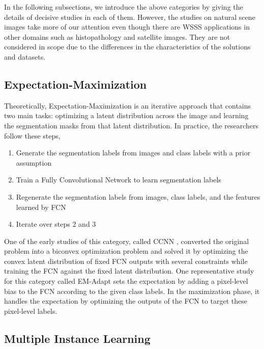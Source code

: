 \documentclass[sn-mathphys]{sn-jnl}
\theoremstyle{thmstyleone}
\theoremstyle{thmstyletwo}\newtheorem{example}{Example}\newtheorem{remark}{Remark}
\theoremstyle{thmstylethree}\newtheorem{definition}{Definition}
\begin{document}
In the following subsections, we introduce the above categories by giving the details of decisive studies in each of them. However, the studies on natural scene images take more of our attention even though there are WSSS applications \cite{DBLP:journals/corr/abs-1808-04277, 9009552, 8953780, DBLP:journals/corr/LinCDWQH17, DBLP:journals/corr/abs-1904-03983, robinson2019large, DBLP:journals/corr/abs-1806-03510, Wang2018WeaklySL} in other domains such as histopathology and satellite images. They are not considered in scope due to the differences in the characteristics of the solutions and datasets.

\subsection{Expectation-Maximization}
\label{expectation_maximization}

Theoretically, Expectation-Maximization is an iterative approach that contains two main tasks: optimizing a latent distribution across the image and learning the segmentation masks from that latent distribution. In practice, the researchers follow these steps, 
\begin{enumerate}
    \item Generate the segmentation labels from images and class labels with a prior assumption
    \item Train a Fully Convolutional Network to learn segmentation labels
    \item Regenerate the segmentation labels from images, class labels, and the features learned by FCN
    \item Iterate over steps 2 and 3
\end{enumerate}
One of the early studies of this category, called CCNN \cite{DBLP:journals/corr/PathakKD15},  converted the original problem into a biconvex optimization problem and solved it by optimizing the convex latent distribution of fixed FCN outputs with several constraints while training the FCN against the fixed latent distribution. One representative study for this category called EM-Adapt \cite{DBLP:journals/corr/PapandreouCMY15} sets the expectation by adding a pixel-level bias to the FCN according to the given class labels. In the maximization phase, it handles the expectation by optimizing the outputs of the FCN to target these pixel-level labels.

\subsection{Multiple Instance Learning}
\label{multiple_instance_learning}
\end{document}
